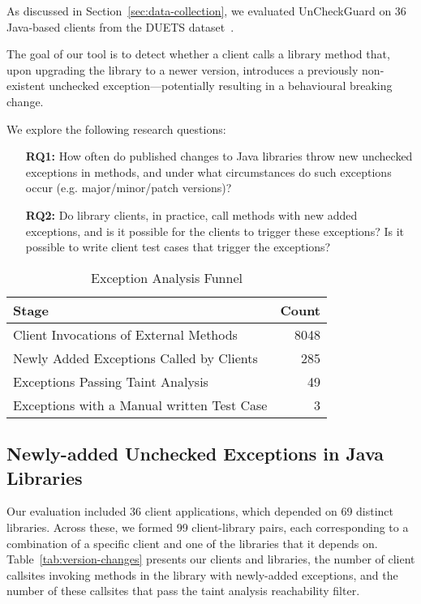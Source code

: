 As discussed in Section~\ref{sec:data-collection}, we evaluated UnCheckGuard on 36 Java-based clients from the DUETS dataset~\cite{durieux21:_duets}.

The goal of our tool is to detect whether a client calls a library method that, upon upgrading the library to a newer version, introduces a previously non-existent unchecked exception—potentially resulting in a behavioural breaking change.

We explore the following research questions:

\begin{itemize}
  \item[\textbf{RQ1:}] How often do published changes to Java libraries throw new unchecked exceptions in methods,
and under what circumstances do such exceptions occur (e.g. major/minor/patch versions)?
  \item[\textbf{RQ2:}]  Do library clients, in practice, call methods with new added exceptions, and is it possible for the clients to trigger these exceptions? Is it possible to write client test cases that trigger the exceptions?
\end{itemize}


\begin{table}[h]
\centering
\caption{Exception Analysis Funnel}
\label{tab:exception-funnel}
\begin{tabular}{l r}
\toprule
\textbf{Stage} & \textbf{Count} \\
\midrule
Client Invocations of External Methods & 8048 \\
Newly Added Exceptions Called by Clients & 285 \\
Exceptions Passing Taint Analysis & 49 \\
Exceptions with a Manual written Test Case & 3 \\
\bottomrule
\end{tabular}
\end{table}


\subsection{Newly-added Unchecked Exceptions in Java Libraries}

Our evaluation included 36 client applications, which depended on 69 distinct libraries. Across these, we formed 99 client-library pairs, each corresponding to a combination of a specific client and one of the libraries that it depends on. Table~\ref{tab:version-changes} presents our clients and libraries, the number of client callsites invoking methods in the library with newly-added exceptions, and the number of these callsites that pass the taint analysis reachability filter.


